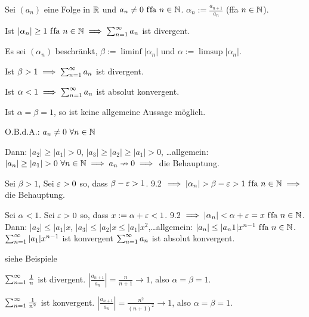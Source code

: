 \documentclass[a4paper,twoside,DIV15,BCOR12mm]{scrbook}
\begin{document}
\begin{satz}[Quotientenkriterium]

Sei $(a_n)$ eine Folge in $\mathbb{R}$ und $a_n \ne 0 \text{ f\/fa } n\in\mathbb{N}$. $\alpha_n := \frac{a_{n+1}}{a_n}$ (ffa $n\in\mathbb{N}$).
\begin{liste}
\item Ist $|\alpha_n| \ge 1 \text{ f\/fa }n\in\mathbb{N} \implies \sum_{n=1}^{\infty}{a_n}$ ist divergent.
\item Es sei $(\alpha_n)$ beschränkt, $\beta := \liminf |\alpha_n|$ und $\alpha := \limsup |\alpha_n|$.
\begin{liste}
\item Ist $\beta > 1 \implies \sum_{n=1}^{\infty}{a_n}$ ist divergent.
\item Ist $\alpha < 1 \implies \sum_{n=1}^{\infty}{a_n}$ ist absolut konvergent.
\item Ist $\alpha = \beta = 1$, so ist keine allgemeine Aussage möglich.
\end{liste}
\end{liste}
\end{satz}

\begin{beweis}
O.B.d.A.: $a_n \ne 0 \ \forall\natn$
\begin{liste}
\item Dann: $|a_2|\ge |a_1|>0$, $|a_3|\ge|a_2|\ge|a_1|>0$, \ldots allgemein: $|a_n|\ge|a_1|>0\ \forall\natn \folgt a_n\nrightarrow 0 \folgt$ die Behauptung.
\item 
\begin{liste}
\item Sei $\beta >1$, Sei $\varepsilon>0$ so, dass $\beta-\varepsilon>1$. 9.2 $\folgt |\alpha_n|>\beta-\ep>1 \ffa n\in\MdN \folgt$ die Behauptung.
\item Sei $\alpha < 1$. Sei $\varepsilon>0$ so, dass $x:=\alpha+\varepsilon<1$. 9.2 $\implies |\alpha_n|<\alpha+\varepsilon=x \text{ f\/fa }n\in\mathbb{N}$. Dann: $|a_2|\le|a_1|x$, $|a_3|\le|a_2|x\le|a_1|x^2$,\ldots allgemein: $|a_n|\le|a_n1|x^{n-1} \text{ f\/fa }n\in\mathbb{N}$. $\sum_{n=1}^{\infty}{|a_1|x^{n-1}}$ ist konvergent  $\sum_{n=1}^{\infty}{a_n}$ ist absolut konvergent.
\item siehe Beispiele
\end{liste}
\end{liste}
\end{beweis}

\begin{beispiele}
\item $\sum_{n=1}^{\infty}{\frac{1}{n}}$ ist divergent. $\left|\frac{a_{n+1}}{a_n}\right| = \frac{n}{n+1} \to 1$, also $\alpha = \beta = 1$.
\item $\sum_{n=1}^{\infty}{\frac{1}{n^2}}$ ist konvergent. $\left|\frac{a_{n+1}}{a_n}\right| = \frac{n^2}{(n+1)^2} \to 1$, also $\alpha = \beta = 1$.
\end{beispiele}
\end{document}
